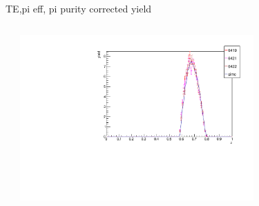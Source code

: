 \begin{frame}{TE,pi eff, pi purity corrected yield}
\begin{columns}
\begin{column}[T]{0.5\textwidth}
\end{column}
\begin{column}[T]{0.5\textwidth}
\includegraphics[width = 0.7\textwidth]{results/yield/check/yieldcheck_270_pos.pdf}
\end{column}
\end{columns}
\end{frame}

